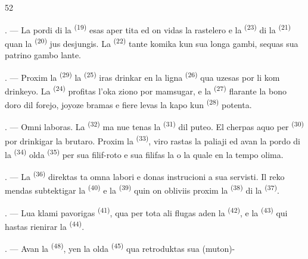 \begin{VUpage}[54]{52}
\VUsaut{3.0mm}

. --- La pordi di la  \textsuperscript{(19)} esas aper\cc
tita ed on vidas la rastelero e la  \textsuperscript{(23)} di\nl
la  \textsuperscript{(21)} quan la  \textsuperscript{(20)} jus\nl
desjungis. La  \textsuperscript{(22)} tante komika kun\nl
sua longa gambi, sequas sua patrino gambo\cc
lante.

. --- Proxim la  \textsuperscript{(29)} la  \textsuperscript{(25)} iras\nl
drinkar en la ligna  \textsuperscript{(26)} qua uzesas por li\nl
kom drinkeyo. La  \textsuperscript{(24)} profitas l'oka\cc
ziono por mamsugar, e la  \textsuperscript{(27)} flarante\nl
la bono doro dil forejo, joyoze bramas e fiere\nl
levas la kapo kun  \textsuperscript{(28)} potenta.

. --- Omni laboras. La  \textsuperscript{(32)} ma\cc
nue tenas la  \textsuperscript{(31)} dil puteo. El cherpas\nl
aquo per  \textsuperscript{(30)} por drinkigar la brutaro.\nl
Proxim la  \textsuperscript{(33)}, viro rastas la paliaji\nl
ed avan la pordo di la  \textsuperscript{(34)} olda \cc
{} \textsuperscript{(35)} per sua filif-roto e sua  filifas la\nl
{} o la  quale en la tempo olima.

\VUsaut{3.0mm}
\VUsaut{3.0mm}

. --- La  \textsuperscript{(36)} direktas ta omna labori\nl
e donas instrucioni a sua servisti. Il reko\cc
mendas subtektigar la  \textsuperscript{(40)} e la  \textsuperscript{(39)}\nl
quin on obliviis proxim la  \textsuperscript{(38)} di la\nl
{} \textsuperscript{(37)}.

. --- Lua klami pavorigas  \textsuperscript{(41)}, qua\nl
per tota ali flugas aden la  \textsuperscript{(42)}, e la\nl
{} \textsuperscript{(43)} qui hastas rienirar la  \textsuperscript{(44)}.

. --- Avan la  \textsuperscript{(48)}, yen la olda\nl
{} \textsuperscript{(45)} qua retroduktas sua (muton)-\cc
\parplein
\end{VUpage}

